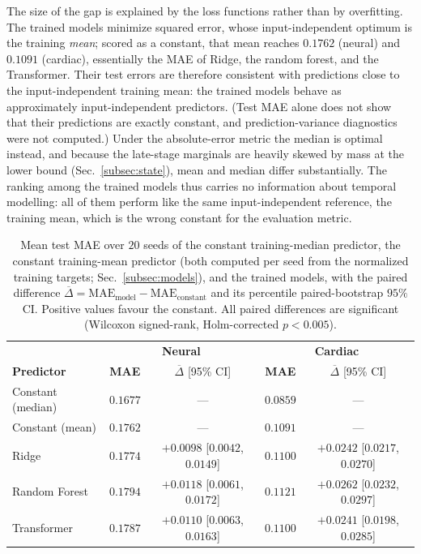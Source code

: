 \documentclass[pdflatex,sn-mathphys-num]{sn-jnl}
\theoremstyle{thmstyleone}%
\theoremstyle{thmstyletwo}%
\theoremstyle{thmstylethree}%
\begin{document}
The size of the gap is explained by the loss functions rather than by overfitting. The trained models minimize squared error, whose input-independent optimum is the training \emph{mean}; scored as a constant, that mean reaches $0.1762$ (neural) and $0.1091$ (cardiac), essentially the MAE of Ridge, the random forest, and the Transformer. Their test errors are therefore consistent with predictions close to the input-independent training mean: the trained models behave as approximately input-independent predictors. (Test MAE alone does not show that their predictions are exactly constant, and prediction-variance diagnostics were not computed.) Under the absolute-error metric the median is optimal instead, and because the late-stage marginals are heavily skewed by mass at the lower bound (Sec.~\ref{subsec:state}), mean and median differ substantially. The ranking among the trained models thus carries no information about temporal modelling: all of them perform like the same input-independent reference, the training mean, which is the wrong constant for the evaluation metric.

\begin{table}[!htbp]
\centering
\caption{\scriptsize Mean test MAE over $20$ seeds of the constant training-median predictor, the constant training-mean predictor (both computed per seed from the normalized training targets; Sec.~\ref{subsec:models}), and the trained models, with the paired difference $\overline{\Delta}=\mathrm{MAE}_{\text{model}}-\mathrm{MAE}_{\text{constant}}$ and its percentile paired-bootstrap $95\%$ CI. Positive values favour the constant. All paired differences are significant (Wilcoxon signed-rank, Holm-corrected $p<0.005$).}
\label{tab:constant}
\vspace{-2mm}
\scriptsize
\setlength{\tabcolsep}{4pt}
\begin{tabular}{lcccc}
\hline \toprule
 & \multicolumn{2}{c}{\textbf{Neural}} & \multicolumn{2}{c}{\textbf{Cardiac}} \\
\textbf{Predictor} & \textbf{MAE} & $\overline{\Delta}$ [95\% CI] & \textbf{MAE} & $\overline{\Delta}$ [95\% CI] \\
\hline
Constant (median) & $0.1677$ & --- & $0.0859$ & --- \\
Constant (mean) & $0.1762$ & --- & $0.1091$ & --- \\
Ridge & $0.1774$ & $+0.0098$ [$0.0042$, $0.0149$] & $0.1100$ & $+0.0242$ [$0.0217$, $0.0270$] \\
Random Forest & $0.1794$ & $+0.0118$ [$0.0061$, $0.0172$] & $0.1121$ & $+0.0262$ [$0.0232$, $0.0297$] \\
Transformer & $0.1787$ & $+0.0110$ [$0.0063$, $0.0163$] & $0.1100$ & $+0.0241$ [$0.0198$, $0.0285$] \\
\hline \toprule
\end{tabular}
\vspace{-3mm}
\end{table}
\end{document}
